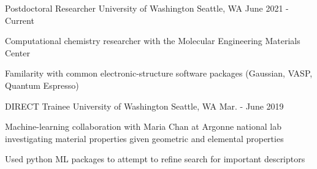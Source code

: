 

\begin{cventries}

 \cventry
   {Postdoctoral Researcher} %
   {University of Washington} %
   {Seattle, WA} %
   {June 2021 - Current} %
   {
     \begin{cvitems} %
       \item {Computational chemistry researcher with the Molecular Engineering Materials Center}
       \item {Familarity with common electronic-structure software packages (Gaussian, VASP, Quantum Espresso)}
     \end{cvitems}
   }


 \cventry
   {DIRECT Trainee} %
   {University of Washington} %
   {Seattle, WA} %
   {Mar. - June 2019} %
   {
     \begin{cvitems} %
       \item {Machine-learning collaboration with Maria Chan at Argonne national lab investigating material properties given geometric and elemental properties}
       \item {Used python ML packages to attempt to refine search for important descriptors}
     \end{cvitems}
   }



\end{cventries}
